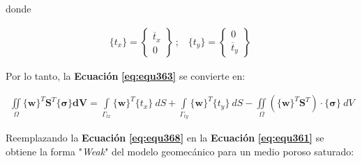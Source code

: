 donde 

\begin{ceqn} %
\begin{gather}\label{eq:equ367}
\{t_x\} = \begin{Bmatrix} \overline{t}_x \\ 0 \end{Bmatrix}\ \text{;}\quad
\{t_y\} = \begin{Bmatrix} 0 \\ \overline{t}_y \end{Bmatrix}\
\end{gather}   
\end{ceqn}

\bigskip
Por lo tanto, la \textbf{Ecuación} \textbf{\ref{eq:equ363}} se convierte en:

\begin{ceqn} %
\begin{gather}\label{eq:equ368}
\iint \limits_\Omega \{\mathbf{w}\}^T \mathbf{S}^T\{\mathbf{\sigma}\} \mathbf{dV} = 
\int \limits_{\Gamma_{tx}} \{\mathbf{w}\}^T \{t_x\}\ dS +
\int \limits_{\Gamma_{ty}} \{\mathbf{w}\}^T \{t_y\}\ dS -
\iint \limits_\Omega (\{\mathbf{w}\}^T \mathbf{S}^T) \cdot \{\mathbf{\sigma}\}\ dV
\end{gather}   
\end{ceqn}

\bigskip
Reemplazando la \textbf{Ecuación} \textbf{\ref{eq:equ368}} en la \textbf{Ecuación} \textbf{\ref{eq:equ361}} se obtiene la forma "\textit{Weak}" del modelo geomecánico para un medio poroso saturado:

